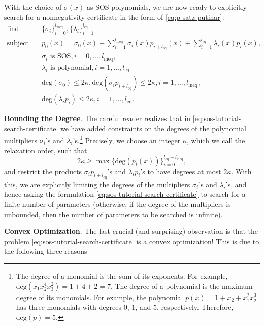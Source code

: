 \documentclass[
]{book}
\theoremstyle{definition}
\theoremstyle{definition}
\theoremstyle{definition}
\theoremstyle{definition}
\theoremstyle{remark}
\begin{document}
With the choice of \(\sigma(x)\) as SOS polynomials, we are now ready to explicitly search for a nonnegativity certificate in the form of \eqref{eq:p-satz-putinar}:
\begin{equation}
\begin{split}
\text{find} &  \quad \{\sigma_i \}_{i=0}^{l_{\mathrm{ineq}}}, \{ \lambda_i \}_{i=1}^{l_{\mathrm{eq}}} \\
\text{subject to} & \quad 
p_0(x) = \sigma_0(x) + \sum_{i=1}^{l_{\mathrm{ineq}}} \sigma_i(x) p_{i + l_{\mathrm{eq}}}(x) + \sum_{i=1}^{l_{\mathrm{eq}}} \lambda_i(x) p_{i}(x), \\
& \quad \sigma_i \text{ is SOS}, i=0,\dots,l_{\mathrm{ineq}}, \\
& \quad \lambda_i \text{ is polynomial}, i=1,\dots,l_{\mathrm{eq}} \\
& \quad \mathrm{deg}(\sigma_0) \leq 2 \kappa, \mathrm{deg}(\sigma_i p_{i+l_{\mathrm{eq}}}) \leq 2 \kappa, i=1,\dots,l_{\mathrm{ineq}}, \\
& \quad \mathrm{deg}(\lambda_i p_i) \leq 2 \kappa, i=1,\dots,l_{\mathrm{eq}}.
\end{split}
\label{eq:sos-tutorial-search-certificate}
\end{equation}

\textbf{Bounding the Degree}. The careful reader realizes that in \eqref{eq:sos-tutorial-search-certificate} we have added constraints on the degrees of the polynomial multipliers \(\sigma_i\)'s and \(\lambda_i\)'s.\footnote{The degree of a monomial is the sum of its exponents. For example, \(\mathrm{deg}(x_1 x_2^4 x_3^2) = 1 + 4 + 2 = 7\). The degree of a polynomial is the maximum degree of its monomials. For example, the polynomial \(p(x) = 1 + x_2 + x_1^2 x_2^3\) has three monomials with degrees \(0\), \(1\), and \(5\), respectively. Therefore, \(\mathrm{deg}(p) = 5\).} Precisely, we choose an integer \(\kappa\), which we call the relaxation order, such that
\[
2 \kappa \geq \max \{ \mathrm{deg}(p_i(x)) \}_{i=0}^{l_{\mathrm{eq}} + l_{\mathrm{ineq}}},
\]
and restrict the products \(\sigma_i p_{i+l_{\mathrm{eq}}}\)'s and \(\lambda_i p_i\)'s to have degrees at most \(2\kappa\). With this, we are explicitly limiting the degrees of the multipliers \(\sigma_i\)'s and \(\lambda_i\)'s, and hence asking the formulation \eqref{eq:sos-tutorial-search-certificate} to search for a finite number of parameters (otherwise, if the degree of the multipliers is unbounded, then the number of parameters to be searched is infinite).

\textbf{Convex Optimization}. The last crucial (and surprising) observation is that the problem \eqref{eq:sos-tutorial-search-certificate} is a convex optimization! This is due to the following three reasons
\end{document}
